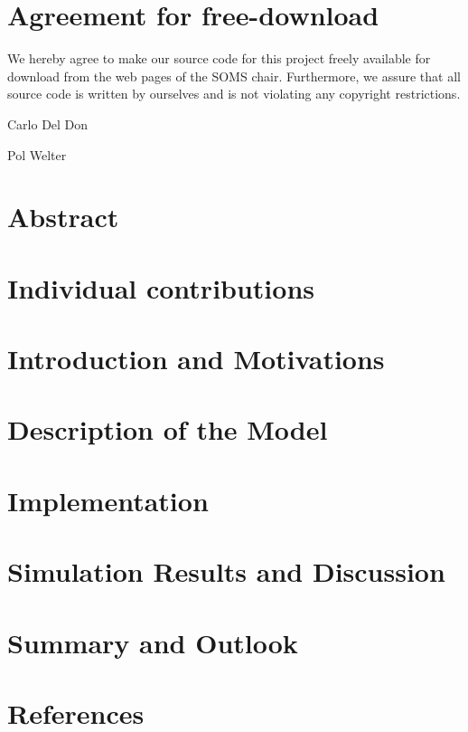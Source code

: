




\newpage


\newpage
\section*{Agreement for free-download}
\bigskip\bigskip

\large We hereby agree to make our source code for this project freely available for download from the web pages of the SOMS chair. Furthermore, we assure that all source code is written by ourselves and is not violating any copyright restrictions.

\begin{minipage}[t][2cm][b]{0.45\textwidth}
    \centering Carlo Del Don
\end{minipage}
\begin{minipage}[t][2cm][b]{0.45\textwidth}
    \centering Pol Welter
\end{minipage}
\newpage




\tableofcontents

\newpage




\section{Abstract}

\section{Individual contributions}

\section{Introduction and Motivations}

\section{Description of the Model}

\section{Implementation}

\section{Simulation Results and Discussion}

\section{Summary and Outlook}

\section{References}






  



 
